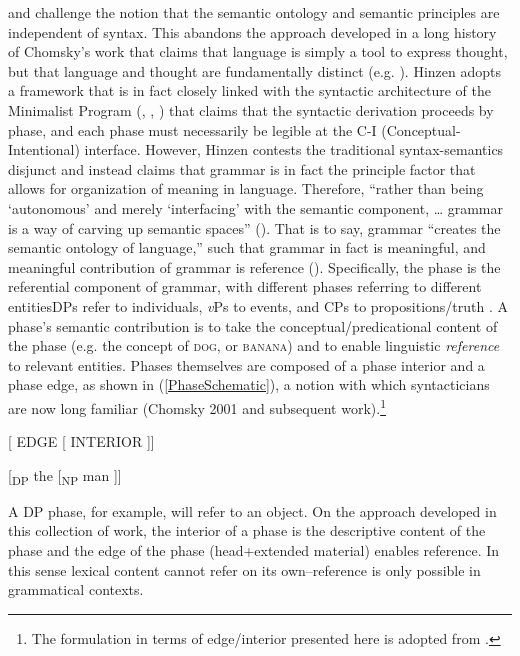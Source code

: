 \documentclass[output=paper
,modfonts
,nonflat
]{langsci/langscibook}
\begin{document}
\citet{Hinzen:2006, Hinzen:2012} and \citet{HinzenSheehan:2013} challenge the notion that the semantic ontology and semantic principles are independent of syntax. This abandons the approach developed in a long history of Chomsky’s work that claims that language is simply a tool to express thought, but that language and thought are fundamentally distinct (e.g. \citealt{Chomsky:2000b}). Hinzen adopts a framework that is in fact closely linked with the syntactic architecture of the Minimalist Program (\citealt{Chomsky2000}, \citealt{Chomsky:2001}, \citealt{Chomsky2008}) that claims that the syntactic derivation proceeds by phase, and each phase must necessarily be legible at the C-I (Conceptual-Intentional) interface. However, Hinzen contests the traditional syntax-semantics disjunct and instead claims that grammar is in fact the principle factor that allows for organization of meaning in language. Therefore, ``rather than being `autonomous' and merely `interfacing' with the semantic component, … grammar is a way of carving up semantic spaces'' (\citealt[311]{Hinzen:2012}).  That is to say, grammar ``creates the semantic ontology of language,'' such that grammar in fact is meaningful, and meaningful contribution of grammar is reference (\citealt[311]{Hinzen:2012}). Specifically, the phase is the referential component of grammar, with different phases referring to different entities\textemdash DPs refer to individuals, \textit{v}Ps to events, and CPs to propositions/truth \citep{HinzenSheehan:2013, SheehanHinzen:2011}.
A phase's semantic contribution is to take the conceptual/predicational content of the phase (e.g. the concept of \textsc{dog}, or \textsc{banana}) and to enable linguistic \textit{reference} to relevant entities. Phases themselves are composed of a phase interior and a phase edge, as shown in (\ref{PhaseSchematic}), a notion with which syntacticians are now long familiar (Chomsky 2001 and subsequent work).\footnote{The formulation in terms of edge/interior presented here is adopted from \citet{HinzenSheehan:2013}.} 



\ea	 \label{PhaseSchematic}
{[} EDGE [ INTERIOR ]]
\z

\ea 
{[}\textsubscript{DP} the [\textsubscript{NP} man ]]
\z

\noindent A DP phase, for example, will refer to an object. On the approach developed in this collection of work, the interior of a phase is the descriptive content of the phase and the edge of the phase (head+extended material) enables reference. In this sense lexical content cannot refer on its own–reference is only possible in grammatical contexts. 
\end{document}
